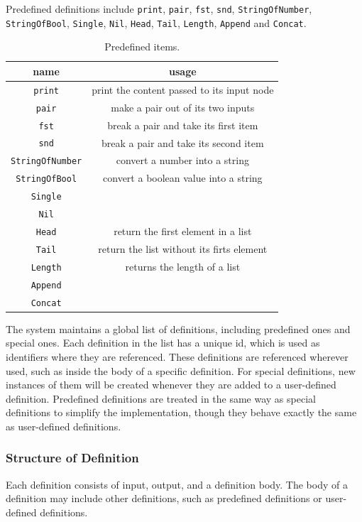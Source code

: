 \documentclass[12pt,UTF8,a4]{article}
\newcommand{\code}[1]{\texttt{#1}}
\begin{document}
Predefined definitions include \code{print}, \code{pair}, \code{fst}, \code{snd}, \code{StringOfNumber}, \code{StringOfBool}, \code{Single}, \code{Nil}, \code{Head}, \code{Tail}, \code{Length}, \code{Append} and \code{Concat}.
\begin{table}[!ht]
\center
\begin{tabular}{c|c}
\hline
name & usage \\
\hline
\code{print} & print the content passed to its input node\\
\code{pair} & make a pair out of its two inputs\\
\code{fst} & break a pair and take its first item \\
\code{snd} & break a pair and take its second item \\
\code{StringOfNumber} & convert a number into a string\\
\code{StringOfBool} & convert a boolean value into a string \\
\code{Single} & \\
\code{Nil} & \\
\code{Head} & return the first element in a list\\
\code{Tail} & return the list without its firts element\\
\code{Length} & returns the length of a list\\
\code{Append} & \\
\code{Concat} & \\
\hline
\end{tabular}
\caption{Predefined items.}\label{tab:pitems}
\end{table}

The system maintains a global list of definitions, including predefined ones and special ones. Each definition in the list has a unique id, which is used as identifiers where they are referenced. These definitions are referenced wherever used, such as inside the body of a specific definition. For special definitions, new instances of them will be created whenever they are added to a user-defined definition. Predefined definitions are treated in the same way as special definitions to simplify the implementation, though they behave exactly the same as user-defined definitions.

\subsubsection{Structure of Definition}
Each definition consists of input, output, and a definition body. The body of a definition may include other definitions, such as predefined definitions or user-defined definitions.
\end{document}
